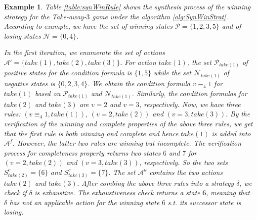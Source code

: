 \documentclass[review]{elsarticle}
\newcommand{\set}[1]{\{ #1 \}}
\newcommand{\positiveSet}{\mathcal{P}}
\newcommand{\negativeSet}{\mathcal{N}}
\newcommand{\act}{\mathcal{A}}
\newcommand{\modulo}{\equiv}
\newtheorem{example}{Example}
\begin{document}
\begin{example} \rm
    Table \ref{table:synWinRule} shows the synthesis process of the winning strategy for the Take-away-$3$ game under the algorithm \ref{alg:SynWinStrat}.
    According to example, we have the set of winning states $\positiveSet = \set{1, 2, 3, 5}$ and of losing states $\negativeSet = \set{0, 4}$.    
	
	In the first iteration, we enumerate the set of actions $\act' = \set{take(1), take(2), take(3)}$.
	For action $take(1)$, the set $\positiveSet_{take(1)}$ of positive states for the condition formula is $\set{1, 5}$ while the set $\negativeSet_{take(1)}$ of negative states is $\set{0, 2, 3, 4}$.
	We obtain the condition formula $v \modulo_4 1$ for $take(1)$ based on $\positiveSet_{take(1)}$ and $\negativeSet_{take(1)}$.
	Similarly, the condition formulas for $take(2)$ and $take(3)$ are $v = 2$ and $v = 3$, respectively.
	Now, we have three rules: $(v \modulo_4 1, take(1))$, $(v = 2, take(2))$ and $(v = 3, take(3))$.
	By the verification of the winning and complete properties of the above three rules, we get that the first rule is both winning and complete and hence $take(1)$ is added into $\act^f$.
	However, the latter two rules are winning but incomplete.
	The verification process for completeness property returns two states $6$ and $7$ for $(v = 2, take(2))$ and $(v = 3, take(3))$, respectively.
	So the two sets $S^c_{take(2)} = \set{6}$ and $S^c_{take(3)} = \set{7}$.
	The set $\act^u$ contains the two actions $take(2)$ and $take(3)$.
	After combing the above three rules into a strategy $\delta$, we check if $\delta$ is exhaustive.
	The exhaustiveness check returns a state $6$, meaning that $\delta$ has not an applicable action for the winning state $6$ s.t. its successor state is losing.
	

\end{example}
\end{document}
